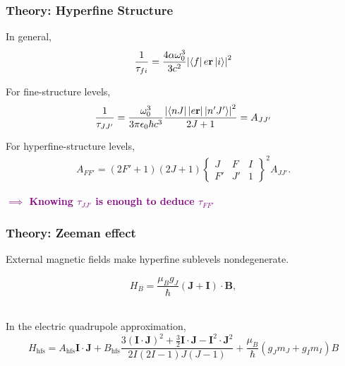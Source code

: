 \documentclass{beamer}
\theoremstyle{definition}
\newcommand{\f}[2]{\frac{#1}{#2}}
\newcommand{\Gj}[6]{ \begin{Bmatrix}
		#1 & #2 & #3 \\
		#4 & #5 & #6 
\end{Bmatrix}}
\begin{document}
\begin{frame}
\end{frame}














\begin{frame}
\frametitle{Theory: Hyperfine Structure}


In general,
\begin{equation*}
\frac{1}{\tau_{fi}}= \frac{4\alpha \omega_0^3}{3c^2}\abs{ \bra{f} e \mathbf{r} \ket{i}}^2
\end{equation*}




For fine-structure levels,
\begin{equation*}
\f{1}{\tau_{JJ'}}  = \f{\omega_0^3}{3\pi \epsilon_0 \hbar c^3} \f{\abs{ \bra{nJ} \abs{e\mathbf{r}} \ket{n'J'}  }^2}{2J + 1} = A_{JJ'}
\end{equation*}




For hyperfine-structure levels,
\begin{align*}
	A_{FF'} = (2F'+1)(2J+1) \Gj{J}{F}{I}{F'}{J'}{1}^2 A_{JJ'}.
\end{align*}



\textbf{\textcolor{purple}{$\implies$ Knowing $\tau_{JJ'}$ is enough to deduce $\tau_{FF'}$}}

\end{frame}



\begin{frame}
\frametitle{Theory: Zeeman effect}


External magnetic fields make hyperfine sublevels nondegenerate.

\begin{equation*}
H_B= \f{\mu_B g_J}{\hbar} ( \mathbf{J} +  \mathbf{I})\cdot \mathbf{B},
\end{equation*}



$\,$\\


In the electric quadrupole approximation,
\begin{equation*}
H_\text{hfs} = A_{\text{hfs}}\mathbf{I}\cdot \mathbf{J} + B_\text{hfs} \f{3(\mathbf{I}\cdot \mathbf{J})^2 + \f{3}{2}\mathbf{I}\cdot \mathbf{J} - \mathbf{I}^2\cdot \mathbf{J}^2}{2I(2I-1)J(J-1)} + \f{\mu_B}{\hbar}(g_Jm_J + g_Im_I)B
\end{equation*}	

\end{frame}
\end{document}
